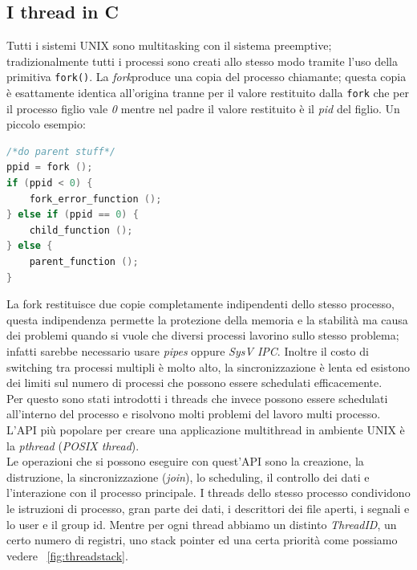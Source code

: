 \subsection{I thread in C}
Tutti i sistemi UNIX sono multitasking con il sistema preemptive; tradizionalmente tutti i processi sono creati allo stesso modo tramite l'uso della primitiva \texttt{fork()}. La \emph{fork}produce una copia del processo chiamante; questa copia è esattamente identica all'origina tranne per il valore restituito dalla \texttt{fork} che per il processo figlio vale \emph{0} mentre nel padre il valore restituito è il \emph{pid} del figlio. Un piccolo esempio:
\begin{lstlisting}[language=C,float=htb,captionpos=b,caption={Esempio di uso della fork},label=lst:fork]
/*do parent stuff*/
ppid = fork ();
if (ppid < 0) {
	fork_error_function ();
} else if (ppid == 0) {
	child_function ();
} else {
	parent_function ();
}
\end{lstlisting}
La fork restituisce due copie completamente indipendenti dello stesso processo, questa indipendenza permette la protezione della memoria e la stabilità ma causa dei problemi quando si vuole che diversi processi lavorino sullo stesso problema; infatti sarebbe necessario usare \emph{pipes} oppure \emph{SysV IPC}. Inoltre il costo di switching tra processi multipli è molto alto, la sincronizzazione è lenta ed esistono dei limiti sul numero di processi che possono essere schedulati efficacemente.\\
Per questo sono stati introdotti i threads che invece possono essere schedulati all'interno del processo e risolvono molti problemi del lavoro multi processo.
L'API più popolare per creare una applicazione multithread in ambiente UNIX è la \emph{pthread} (\emph{POSIX thread}).\\
Le operazioni che si possono eseguire con quest'API sono la creazione, la distruzione, la sincronizzazione (\emph{join}), lo scheduling, il controllo dei dati e l'interazione con il processo principale. I threads dello stesso processo condividono le istruzioni di processo, gran parte dei dati, i descrittori dei file aperti, i segnali e lo user e il group id. Mentre per ogni thread abbiamo un distinto \emph{ThreadID}, un certo numero di registri, uno stack pointer ed una certa priorità come possiamo vedere \figurename~\ref{fig:threadstack}.
